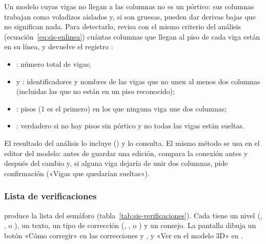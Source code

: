 Un modelo cuyas vigas no llegan a las columnas no es un pórtico: sus columnas trabajan como voladizos aislados y, si son
gruesas, pueden dar derivas bajas que no significan nada. Para detectarlo,  revisa con
el mismo criterio del análisis (ecuación~\ref{eq:sis-enlinea}) cuántas columnas que llegan al piso de cada viga están en
su línea, y devuelve el registro :

\begin{itemize}
	\item {}: número total de vigas;
	\item {} y : identificadores y nombres de las vigas que no unen al menos dos columnas
	      (incluidas las que no están en un piso reconocido);
	\item {}: pisos (1 es el primero) en los que ninguna viga une dos columnas;
	\item {}: verdadero si no hay pisos sin pórtico y no todas las vigas están sueltas.
\end{itemize}

El resultado del análisis lo incluye () y 
lo consulta. El mismo método se usa en el editor del modelo: antes de guardar una edición,
 compara la conexión antes y después del cambio y, si alguna viga
dejaría de unir dos columnas, pide confirmación («Vigas que quedarían sueltas»).

\subsubsection{Lista de verificaciones}

 produce la lista del semáforo (tabla~\ref{tab:sis-verificaciones}).
Cada  tiene un nivel (, ,  o ), un texto, un tipo de
corrección (, ,  o ) y un consejo. La pantalla dibuja un botón
«Cómo corregir» en las correcciones  y , y «Ver en el modelo 3D» en .

